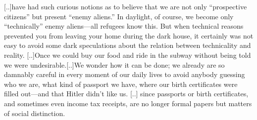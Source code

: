 [..]have had such curious notions as to believe that we are not only “prospective citizens” but present “enemy aliens.” In daylight, of course, we become only “technically” enemy aliens—all refugees know this. But when technical reasons prevented you from leaving your home during the dark house, it certainly was not easy to avoid some dark speculations about the relation between technicality and reality.
[..]Once we could buy our food and ride in the subway without being told we were undesirable.[..]We wonder how it can be done; we already are so damnably careful in every moment of our daily lives to avoid anybody guessing who we are, what kind of passport we have, where our birth certificates were filled out—and that Hitler didn’t like us. 
[..] since passports or birth certificates, and sometimes even income tax receipts, are no longer formal papers but matters of social distinction.

